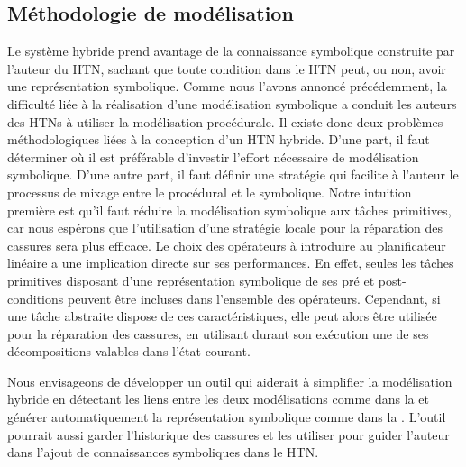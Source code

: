 \documentclass[a4paper,twoside,french]{article}
\begin{document}
		\subsection{Méthodologie de modélisation}
		Le système hybride prend avantage de la connaissance symbolique construite par l'auteur du HTN, sachant que toute condition  dans le HTN peut, ou non, avoir une représentation symbolique. Comme  nous l'avons annoncé précédemment, la difficulté liée à la réalisation d'une modélisation symbolique a conduit les auteurs des HTNs à utiliser la modélisation procédurale. Il existe donc deux problèmes méthodologiques liées à la conception d'un HTN hybride. D'une part, il faut déterminer où il est préférable d'investir l'effort nécessaire de modélisation symbolique. D'une autre part, il faut définir une stratégie qui facilite à l'auteur le processus de mixage entre le procédural et le symbolique. Notre intuition première est qu'il faut réduire la modélisation symbolique aux tâches primitives, car nous espérons que l'utilisation d'une stratégie locale pour la réparation des cassures sera plus efficace. Le choix des opérateurs à introduire au planificateur linéaire a une implication directe sur ses performances. En effet, seules les tâches primitives disposant d'une représentation symbolique de ses pré et post-conditions peuvent être incluses dans l'ensemble des opérateurs. Cependant, si une tâche abstraite dispose de ces caractéristiques, elle peut alors être  utilisée pour la réparation des cassures, en utilisant durant son exécution une de ses décompositions valables dans l'état courant. 
		\par Nous envisageons de développer un outil qui aiderait à simplifier la modélisation hybride en détectant les liens entre les deux modélisations comme dans la  et générer automatiquement la représentation symbolique comme dans la . L'outil pourrait aussi garder l'historique des cassures et les utiliser pour guider l'auteur dans l'ajout de connaissances symboliques dans le HTN.
		
\end{document}

